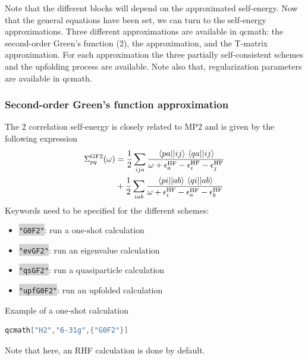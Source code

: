 \documentclass[aip,jcp,reprint,noshowkeys,superscriptaddress]{revtex4-1}
\newcommand{\GW}{\text{$GW$}}
\newcommand{\GFtwo}{\text{GF}2}
\newcommand{\GF}{\text{GF}}
\newcommand{\HF}{\text{HF}}
\newcommand{\ep}{\epsilon}
\newcommand{\Sigm}{\Sigma}
\newcommand{\ERI}[2]{\mel{#1}{}{#2}}
\newcommand{\keyword}[1]{{\colorbox{lightgray}{\texttt{#1}}}}
\begin{document}
Note that the different blocks will depend on the approximated self-energy. Now that the general equations have been set, we can turn to the self-energy approximations. Three different approximations are available in qcmath: the second-order Green's function (\GFtwo), the {\GW} approximation, and the T-matrix approximation. For each approximation the three partially self-consistent schemes and the upfolding process are available. Note also that, regularization parameters are available in qcmath.
 
\subsubsection*{Second-order Green's function approximation}
The {\GFtwo} correlation self-energy is closely related to MP2 and is given by the following expression
\begin{equation}
\label{eq:SigCGF2}
\begin{split}
	\Sigm_{pq}^{\GF2}(\omega) 
	& = \frac{1}{2}\sum_{ija} \frac{\ERI{pa}{ij} \ERI{qa}{ij}}{\omega + \ep_{a}^{\HF} - \ep_{i}^{\HF} - \ep_{j}^{\HF}}
	\\
	& + \frac{1}{2}\sum_{iab} \frac{\ERI{pi}{ab} \ERI{qi}{ab}}{\omega + \ep_{i}^{\HF} - \ep_{a}^{\HF} - \ep_{b}^{\HF}}
\end{split}
\end{equation}
Keywords need to be specified for the different schemes: 
\begin{itemize}
\item \keyword{"G0F2"}: run a one-shot calculation
\item \keyword{"evGF2"}: run an eigenvalue calculation 
\item \keyword{"qsGF2"}: run a quasiparticle calculation 
\item \keyword{"upfG0F2"}: run an upfolded calculation
\end{itemize}

Example of a one-shot calculation
\begin{lstlisting}[extendedchars=true,language=Mathematica]
	qcmath["H2","6-31g",{"G0F2"}]
\end{lstlisting}
Note that here, an RHF calculation is done by default.

\end{document}
